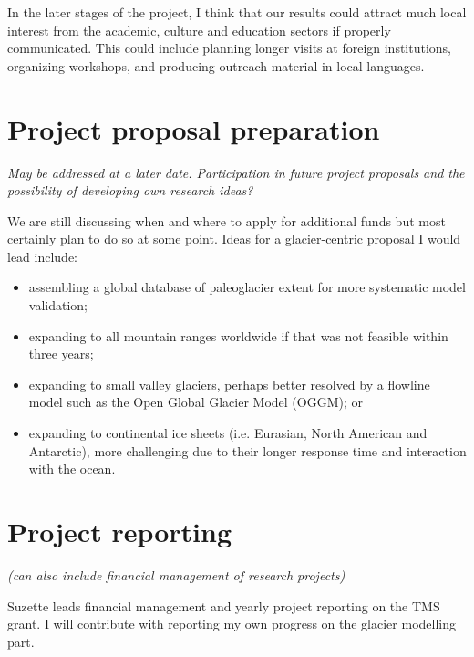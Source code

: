 \documentclass{article}
\newcommand{\guideline}[1]{{\color{color2}\itshape{#1}}}
\begin{document}
    In the later stages of the project, I think that our results could attract
    much local interest from the academic, culture and education sectors if
    properly communicated. This could include planning longer visits at foreign
    institutions, organizing workshops, and producing outreach material in
    local languages.


\section{Project proposal preparation}

    \guideline{
        May be addressed at a later date. Participation in future project
        proposals and the possibility of developing own research ideas?}

    We are still discussing when and where to apply for additional funds but
    most certainly plan to do so at some point. Ideas for a glacier-centric
    proposal I would lead include:

    \begin{itemize}
      \item assembling a global database of paleoglacier extent for more
        systematic model validation;
      \item expanding to all mountain ranges worldwide if that was not feasible
        within three years;
      \item expanding to small valley glaciers, perhaps better resolved by
        a flowline model such as the Open Global Glacier Model (OGGM); or
      \item expanding to continental ice sheets (i.e. Eurasian, North American
        and Antarctic), more challenging due to their longer response time and
        interaction with the ocean.
    \end{itemize}


\section{Project reporting}

\guideline{
    (can also include financial management of research projects)}

    Suzette leads financial management and yearly project reporting on the TMS
    grant. I will contribute with reporting my own progress on the glacier
    modelling part.
\end{document}

